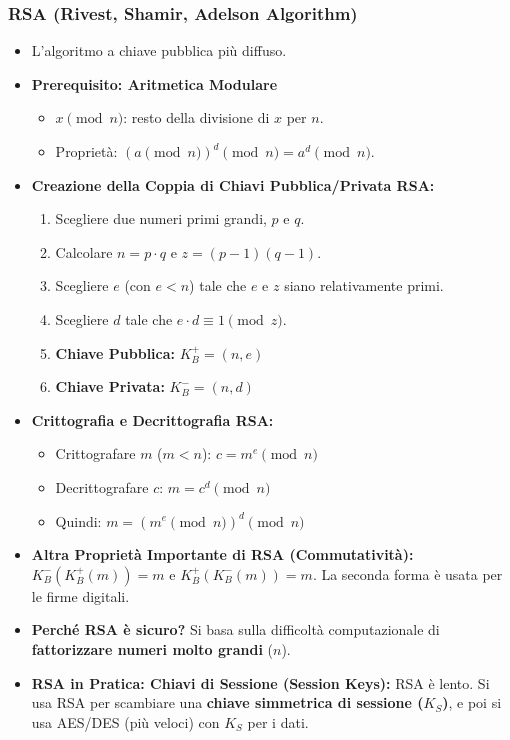 \subsubsection{RSA (Rivest, Shamir, Adelson Algorithm)}
\begin{itemize}
    \item L'algoritmo a chiave pubblica più diffuso.
    \item \textbf{Prerequisito: Aritmetica Modulare}
    \begin{itemize}
        \item $x \pmod n$: resto della divisione di $x$ per $n$.
        \item Proprietà: $(a \pmod n)^d \pmod n = a^d \pmod n$.
    \end{itemize}
    \item \textbf{Creazione della Coppia di Chiavi Pubblica/Privata RSA:}
    \begin{enumerate}
        \item Scegliere due numeri primi grandi, $p$ e $q$.
        \item Calcolare $n = p \cdot q$ e $z = (p-1)(q-1)$.
        \item Scegliere $e$ (con $e<n$) tale che $e$ e $z$ siano relativamente primi.
        \item Scegliere $d$ tale che $e \cdot d \equiv 1 \pmod z$.
        \item \textbf{Chiave Pubblica:} $K_B^+ = (n, e)$
        \item \textbf{Chiave Privata:} $K_B^- = (n, d)$
    \end{enumerate}
    \item \textbf{Crittografia e Decrittografia RSA:}
    \begin{itemize}
        \item Crittografare $m$ ($m < n$): $c = m^e \pmod n$
        \item Decrittografare $c$: $m = c^d \pmod n$
        \item Quindi: $m = (m^e \pmod n)^d \pmod n$
    \end{itemize}
    \item \textbf{Altra Proprietà Importante di RSA (Commutatività):}
    $K_B^-(K_B^+(m)) = m$ e $K_B^+(K_B^-(m)) = m$. La seconda forma è usata per le firme digitali.
    \item \textbf{Perché RSA è sicuro?} Si basa sulla difficoltà computazionale di \textbf{fattorizzare numeri molto grandi} ($n$).
    \item \textbf{RSA in Pratica: Chiavi di Sessione (Session Keys):}
    RSA è lento. Si usa RSA per scambiare una \textbf{chiave simmetrica di sessione ($K_S$)}, e poi si usa AES/DES (più veloci) con $K_S$ per i dati.
\end{itemize}

